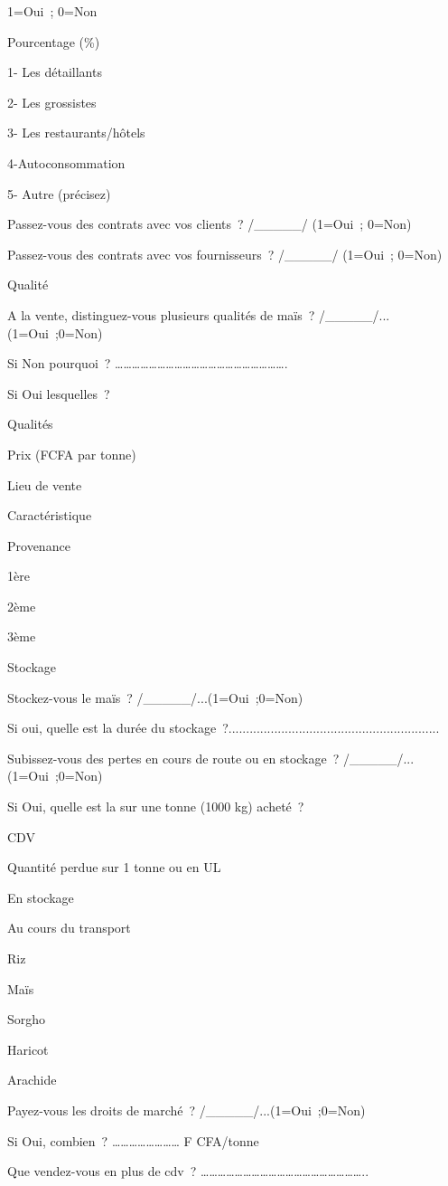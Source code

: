 \documentclass[12pt,oneside]{report}
\begin{document}
1=Oui ; 0=Non

Pourcentage (\%)

1- Les détaillants

2- Les grossistes

3- Les restaurants/hôtels

4-Autoconsommation

5- Autre (précisez)

Passez-vous des contrats avec vos clients ? /\_\_\_\_\_/   (1=Oui ; 0=Non)

Passez-vous des contrats avec vos fournisseurs ? /\_\_\_\_\_/   (1=Oui ; 0=Non)

Qualité

A la vente, distinguez-vous plusieurs qualités de maïs ? /\_\_\_\_\_/...(1=Oui ;0=Non)

Si Non pourquoi ? …………………………………………………….

Si Oui lesquelles ?

Qualités

Prix (FCFA par tonne)

Lieu de vente

Caractéristique

Provenance

1ère

2ème

3ème

Stockage

Stockez-vous le maïs ? /\_\_\_\_\_/...(1=Oui ;0=Non)

Si oui, quelle est la durée du stockage ?............................................................

Subissez-vous des pertes en cours de route ou en stockage ? /\_\_\_\_\_/...(1=Oui ;0=Non)

Si Oui, quelle est la sur une tonne (1000 kg) acheté ?

CDV

Quantité perdue sur 1 tonne ou en UL

En stockage

Au cours du transport

Riz

Maïs

Sorgho

Haricot

Arachide

Payez-vous les droits de marché ? /\_\_\_\_\_/...(1=Oui ;0=Non)

Si Oui, combien ? …………………… F CFA/tonne

Que vendez-vous en plus de cdv ? …………………………………………………..
\end{document}
